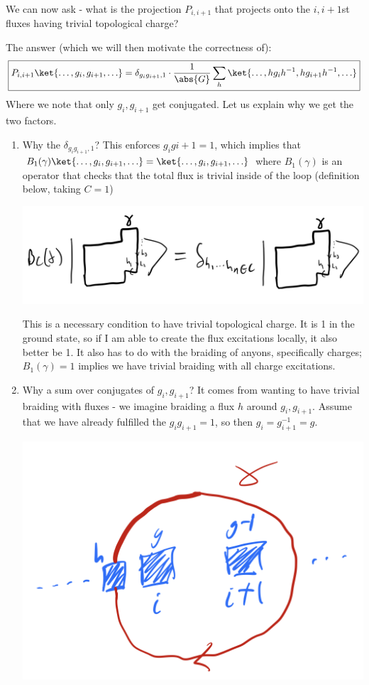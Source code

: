We can now ask - what is the projection $P_{i,i+1}$ that projects onto the $i, i+1$st fluxes having trivial topological charge?

The answer (which we will then motivate the correctness of):
\begin{equation}\label{eq:projectionaction}
    \boxed{P_{i, i+1}\ket{\ldots, g_{i}, g_{i+1}, \ldots} = \delta_{g_ig_{i+1}, 1}\cdot\frac{1}{\abs{G}}\sum_h \ket{\ldots, hg_i h^{-1}, h g_{i+1}h^{-1}, \ldots}}
\end{equation}
Where we note that only $g_i, g_{i+1}$ get conjugated. Let us explain why we get the two factors.
\begin{enumerate}
    \item Why the $\delta_{g_ig_{i+1}, 1}$? This enforces $g_ig{i+1} = 1$,  which implies that $B_1(\gamma)\ket{\ldots, g_i, g_{i+1}, \ldots} = \ket{\ldots, g_i, g_{i+1}, \ldots}$ where $B_1(\gamma)$ is an operator that checks that the total flux is trivial inside of the loop (definition below, taking $C = 1$)
    \begin{center}
        \includegraphics[scale=0.35]{Lectures/Images/lec8-Bcgamma.png}
    \end{center}
    This is a necessary condition to have trivial topological charge. It is 1 in the ground state, so if I am able to create the flux excitations locally, it also better be 1. It also has to do with the braiding of anyons, specifically charges; $B_1(\gamma) = 1$ implies we have trivial braiding with all charge excitations.
    \item Why a sum over conjugates of $g_i, g_{i+1}$? It comes from wanting to have trivial braiding with fluxes - we imagine braiding a flux $h$ around $g_{i}, g_{i+1}$. Assume that we have already fulfilled the $g_ig_{i+1} = 1$, so then $g_i = g_{i+1}^{-1} = g$.
    \begin{center}
        \includegraphics[scale=0.35]{Lectures/Images/lec10-mbraid.png}
    \end{center}


\end{enumerate}
